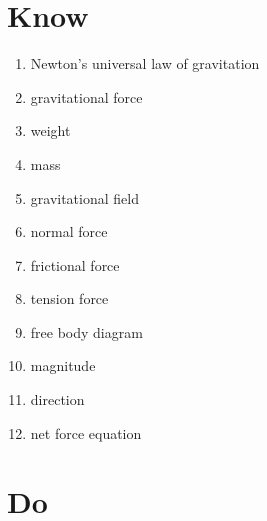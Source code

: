 \documentclass[answers]{exam}
\begin{document}
\section*{Know}

\begin{multicols}{3}
\begin{enumerate}[itemsep=0pt]
    \item Newton's universal law of gravitation
    \item gravitational force
    \item weight
    \item mass
    \item gravitational field
    \item normal force
    \item frictional force
    \item tension force
    \item free body diagram
    \item magnitude
    \item direction
    \item net force equation
\end{enumerate}
\end{multicols}




\section*{Do}
\end{document}
